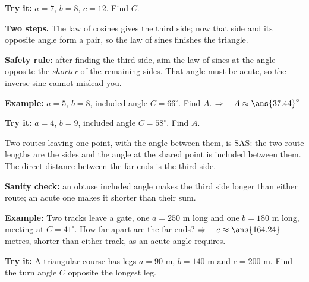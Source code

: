 \documentclass[12pt]{article}
\begin{document}
\begin{tryitbox}
\textbf{Try it:} \quad $a = 7$, $b = 8$, $c = 12$. Find $C$.\\[2pt]
\end{tryitbox}


\begin{formulabox}
\textbf{Two steps.} The law of cosines gives the third side; now that side and its opposite angle form a pair, so the law of sines finishes the triangle.\par
\textbf{Safety rule:} after finding the third side, aim the law of sines at the angle opposite the \emph{shorter} of the remaining sides. That angle must be acute, so the inverse sine cannot mislead you.
\end{formulabox}

\begin{examplebox}
\textbf{Example:} \quad $a = 5$, $b = 8$, included angle $C = 66^\circ$. Find $A$.
$\Rightarrow\quad A \approx \ans{37.44}^\circ$
\end{examplebox}

\begin{tryitbox}
\textbf{Try it:} \quad $a = 4$, $b = 9$, included angle $C = 58^\circ$. Find $A$.\\[2pt]
\end{tryitbox}


\begin{formulabox}
Two routes leaving one point, with the angle between them, is SAS: the two route lengths are the sides and the angle at the shared point is included between them. The direct distance between the far ends is the third side.\par
\textbf{Sanity check:} an obtuse included angle makes the third side longer than either route; an acute one makes it shorter than their sum.
\end{formulabox}

\begin{examplebox}
\textbf{Example:} \quad Two tracks leave a gate, one $a = 250$ m long and one $b = 180$ m long, meeting at $C = 41^\circ$. How far apart are the far ends?
$\Rightarrow\quad c \approx \ans{164.24}$ metres, shorter than either track, as an acute angle requires.
\end{examplebox}

\begin{tryitbox}
\textbf{Try it:} \quad A triangular course has legs $a = 90$ m, $b = 140$ m and $c = 200$ m. Find the turn angle $C$ opposite the longest leg.\\[2pt]
\end{tryitbox}
\end{document}
